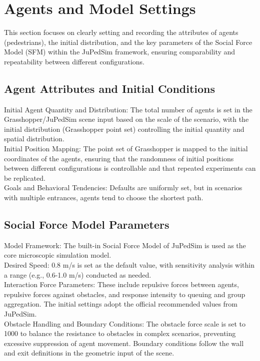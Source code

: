 \section{Agents and Model Settings}

This section focuses on clearly setting and recording the attributes of agents (pedestrians), the initial distribution, and the key parameters of the Social Force Model (SFM) within the JuPedSim framework, ensuring comparability and repeatability between different configurations.

\subsection{Agent Attributes and Initial Conditions}

Initial Agent Quantity and Distribution: The total number of agents is set in the Grasshopper/JuPedSim scene input based on the scale of the scenario, with the initial distribution (Grasshopper point set) controlling the initial quantity and spatial distribution.
\\Initial Position Mapping: The point set of Grasshopper is mapped to the initial coordinates of the agents, ensuring that the randomness of initial positions between different configurations is controllable and that repeated experiments can be replicated.
\\Goals and Behavioral Tendencies: Defaults are uniformly set, but in scenarios with multiple entrances, agents tend to choose the shortest path.

\subsection{Social Force Model Parameters}

Model Framework: The built-in Social Force Model of JuPedSim is used as the core microscopic simulation model.
\\Desired Speed: 0.8 m/s is set as the default value, with sensitivity analysis within a range (e.g., 0.6-1.0 m/s) conducted as needed.
\\Interaction Force Parameters: These include repulsive forces between agents, repulsive forces against obstacles, and response intensity to queuing and group aggregation. The initial settings adopt the official recommended values from JuPedSim.
\\Obstacle Handling and Boundary Conditions: The obstacle force scale is set to 1000 to balance the resistance to obstacles in complex scenarios, preventing excessive suppression of agent movement. Boundary conditions follow the wall and exit definitions in the geometric input of the scene.

